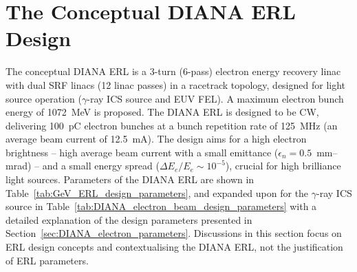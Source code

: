 \documentclass[../main.tex]{subfiles}
\begin{document}
\section{The Conceptual DIANA ERL Design}
\label{sec:DIANA_ERL_design}

The conceptual DIANA ERL is a 3-turn (6-pass) electron energy recovery linac with dual SRF linacs (12 linac passes) in a racetrack topology, designed for light source operation ($\gamma$-ray ICS source and EUV FEL). A maximum electron bunch energy of 1072~\si{\mega\electronvolt} is proposed. The DIANA ERL is designed to be CW, delivering 100~\si{\pico\coulomb} electron bunches at a bunch repetition rate of 125~\si{\mega\hertz} (an average beam current of 12.5~\si{\milli\ampere}). The design aims for a high electron brightness -- high average beam current with a small emittance ($\epsilon_{n}=0.5$~\si{\milli\meter}--\si{\milli\radian}) -- and a small energy spread ($\Delta E_{e}/E_{e} \sim 10^{-5}$), crucial for high brilliance light sources. Parameters of the DIANA ERL are shown in Table~\ref{tab:GeV_ERL_design_parameters}, and expanded upon for the $\gamma$-ray ICS source in Table~\ref{tab:DIANA_electron_beam_design_parameters} with a detailed explanation of the design parameters presented in Section~\ref{sec:DIANA_electron_parameters}. Discussions in this section focus on ERL design concepts and contextualising the DIANA ERL, not the justification of ERL parameters. 
\end{document}

